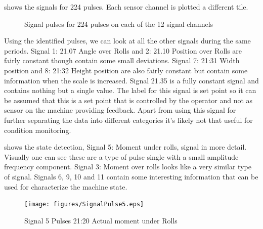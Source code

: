 \documentclass[]{article}
\begin{document}
 shows the signals for 224 pulses. Each sensor channel is plotted a different tile. 
\begin{figure}[H]
    \caption{Signal pulses for 224 pulses on each of the 12 signal channels}
    \label{fig:SignalPulses}
\end{figure}

Using the identified pulses, we can look at all the other signals during the same periods. Signal 1: 21.07 Angle over Rolls and 2: 21.10 Position over Rolls are fairly constant though contain some small deviations. Signal 7: 21:31 Width position and  8: 21:32 Height position are also fairly constant but contain some information when the scale is increased. Signal 21.35 is a fully constant signal and contains nothing but a single value. The label for this signal is set point so it can be assumed that this is a set point that is controlled by the operator and not as sensor on the machine providing feedback. Apart from using this signal for further separating the data into different categories it's likely not that useful for condition monitoring.

 shows the state detection, Signal 5: Moment under rolls, signal in more detail. Visually one can see these are a type of pulse single with a small amplitude frequency component. Signal 3: Moment over rolls looks like a very similar type of signal. Signals 6, 9, 10 and 11 contain some interesting information that can be used for characterize the machine state.

 
 

\begin{figure}[H]
    \centering
    \texttt{[image: figures/SignalPulse5.eps]}
    \caption{Signal 5 Pulses 21:20 Actual moment under Rolls}
    \label{fig:SignalPulse5}
\end{figure}


\end{document}
